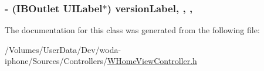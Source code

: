\hypertarget{interface_w_home_view_controller_abc9706c23172fe2da2ebd7638fe64cc6}{
\subsubsection[{version\-Label}]{\setlength{\rightskip}{0pt plus 5cm}-\/ (I\-B\-Outlet U\-I\-Label$\ast$) version\-Label\hspace{0.3cm}{\ttfamily [read]}, {\ttfamily [write]}, {\ttfamily [nonatomic]}, {\ttfamily [retain]}}}\label{interface_w_home_view_controller_abc9706c23172fe2da2ebd7638fe64cc6}


The documentation for this class was generated from the following file\-:\begin{DoxyCompactItemize}
\item 
/\-Volumes/\-User\-Data/\-Dev/woda-\/iphone/\-Sources/\-Controllers/\hyperlink{_w_home_view_controller_8h}{W\-Home\-View\-Controller.\-h}\end{DoxyCompactItemize}
